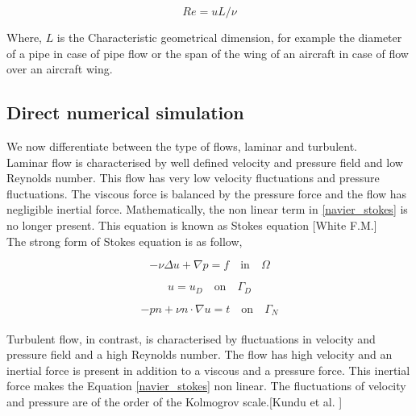 \documentclass[a4paper]{book}
\begin{document}
\begin{equation} \label{reynolds_number}
Re =  u L / \nu
\end{equation}

Where, $L$ is the Characteristic geometrical dimension, for example the diameter of a pipe in case of pipe flow or the span of the wing of an aircraft in case of flow over an aircraft wing.\\

\subsection[DNS]{Direct numerical simulation} 

We now differentiate between the type of flows, laminar and turbulent.\\

Laminar flow is characterised by well defined velocity and pressure field and low Reynolds number. This flow has very low velocity fluctuations and pressure fluctuations. The viscous force is balanced by the pressure force and the flow has negligible inertial force. Mathematically, the non linear term in \eqref{navier_stokes} is no longer present. This equation is known as Stokes equation [White F.M.\cite{white}]\\

The strong form of Stokes equation is as follow,

\begin{equation} \label{stokes_strong_form}
-\nu \Delta u + \nabla p = f \quad \textrm{in} \quad \Omega
\end{equation}

\begin{equation} \label{dirichlet condition stokes}
u = u_D \quad \textrm{on} \quad \Gamma_D
\end{equation}

\begin{equation} \label{neumann condition stokes}
-pn + \nu n \cdot \nabla u = t \quad \textrm{on} \quad \Gamma_N
\end{equation}
\\

Turbulent flow, in contrast, is characterised by fluctuations in velocity and pressure field and a high Reynolds number. The flow has high velocity and an inertial force is present in addition to a viscous and a pressure force. This inertial force makes the Equation \eqref{navier_stokes} non linear. The fluctuations of velocity and pressure are of the order of the Kolmogrov scale.[Kundu et al. \cite{Kundu}]\\
\end{document}
